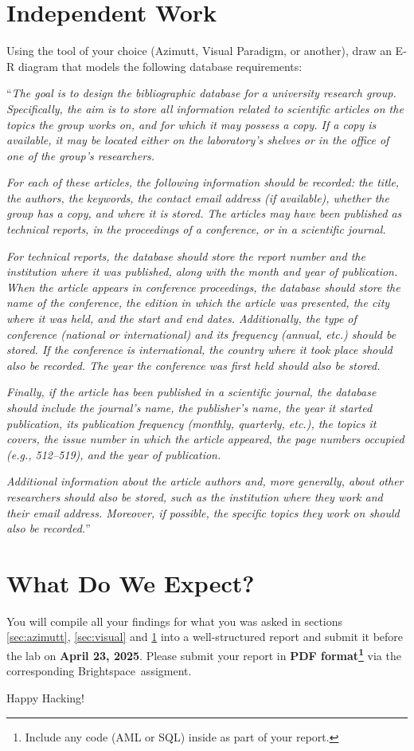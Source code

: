 \documentclass{article}
\begin{document}
\section{Independent Work} \label{sec:work}
Using the tool of your choice (Azimutt, Visual Paradigm, or another), draw an E-R diagram that models the following database requirements:

``\textit{The goal is to design the bibliographic database for a university research group. Specifically, the aim is to store all information related to scientific articles on the topics the group works on, and for which it may possess a copy. If a copy is available, it may be located either on the laboratory’s shelves or in the office of one of the group’s researchers.}

\textit{For each of these articles, the following information should be recorded: the title, the authors, the keywords, the contact email address (if available), whether the group has a copy, and where it is stored. The articles may have been published as technical reports, in the proceedings of a conference, or in a scientific journal.}

\textit{For technical reports, the database should store the report number and the institution where it was published, along with the month and year of publication. When the article appears in conference proceedings, the database should store the name of the conference, the edition in which the article was presented, the city where it was held, and the start and end dates. Additionally, the type of conference (national or international) and its frequency (annual, etc.) should be stored. If the conference is international, the country where it took place should also be recorded. The year the conference was first held should also be stored.}

\textit{Finally, if the article has been published in a scientific journal, the database should include the journal’s name, the publisher’s name, the year it started publication, its publication frequency (monthly, quarterly, etc.), the topics it covers, the issue number in which the article appeared, the page numbers occupied (e.g., 512–519), and the year of publication.}

\textit{Additional information about the article authors and, more generally, about other researchers should also be stored, such as the institution where they work and their email address. Moreover, if possible, the specific topics they work on should also be recorded.}''

\section{What Do We Expect?}
You will compile all your findings for what you was asked in sections \ref{sec:azimutt}, \ref{sec:visual} and \ref{sec:work} into a well-structured report and submit it before the lab on \textbf{April 23, 2025}. Please submit your report in \textbf{PDF format\footnote{Include any code (AML or SQL) inside as part of your report.}}  via the corresponding Brightspace\texttrademark ~assigment.

\vspace{5mm}
Happy Hacking! 
\end{document}

